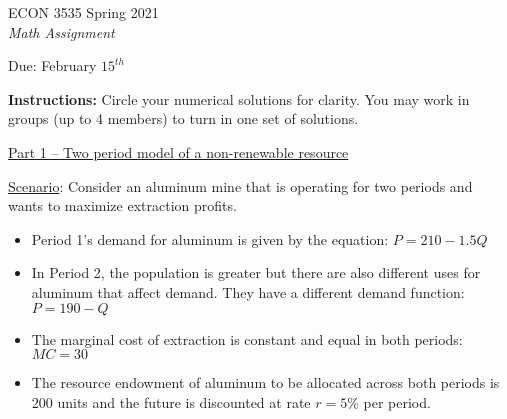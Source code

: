\documentclass[11pt]{article}
\author{\normalsize Kyle Butts\\{\footnotesize Univ. of Colorado, Boulder}}
\date{\footnotesize\today}
\begin{document}
\begin{center}
    \color{navyblue}
    {\Large ECON 3535 Spring 2021 \\ \textit{Math Assignment}}

    Due: February $15^{th}$
\end{center}

\noindent
\textbf{Instructions:} Circle your numerical solutions for clarity. You may work in groups (up to 4 members)
to turn in one set of solutions.

\begin{center}
    \underline{Part 1 -- Two period model of a non-renewable resource}
\end{center}

\noindent
\underline{Scenario}: Consider an aluminum mine that is operating for two periods and wants to maximize extraction profits.

\begin{itemize}
    \item Period 1's demand for aluminum is given by the equation: $P = 210 - 1.5Q$
    
    \item In Period 2, the population is greater but there are also different uses for aluminum that affect demand. They have a different demand function: $P = 190 - Q$

    \item The marginal cost of extraction is constant and equal in both periods: $MC = 30$
    
    \item The resource endowment of aluminum to be allocated across both periods is $200$ units and the future is discounted at rate $r = 5\%$ per period.
\end{itemize}
\end{document}
